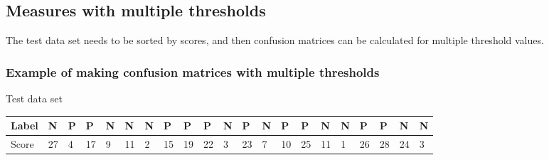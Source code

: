 %
%

%
%
\subsection{Measures with multiple thresholds}
The test data set needs to be sorted by scores, and then confusion matrices can be calculated for multiple threshold values.

%
%
\subsubsection*{Example of making confusion matrices with multiple thresholds}

\noindent
Test data set
\begin{table}[H]
\centering
\scriptsize
\begin{tabular}{|l|l|l|l|l|l|l|l|l|l|l|l|l|l|l|l|l|l|l|l|l|}
\hline
Label & N  & P & P  & N & N  & N & P  & P  & P  & N & P  & N & P  & P  & N  & N & P  & P  & N  & N \\ \hline
Score & 27 & 4 & 17 & 9 & 11 & 2 & 15 & 19 & 22 & 3 & 23 & 7 & 10 & 25 & 11 & 1 & 26 & 28 & 24 & 3 \\ \hline
\end{tabular}
\end{table}

